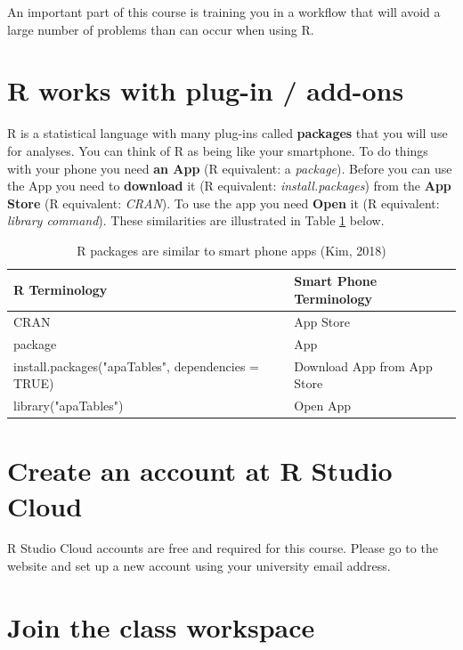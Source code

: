 \documentclass[
]{krantz}
\begin{document}
An important part of this course is training you in a workflow that will avoid a large number of problems than can occur when using R.

\hypertarget{r-works-with-plug-in-add-ons}{%
\section{R works with plug-in / add-ons}\label{r-works-with-plug-in-add-ons}}

R is a statistical language with many plug-ins called \textbf{packages} that you will use for analyses. You can think of R as being like your smartphone. To do things with your phone you need \textbf{an App} (R equivalent: a \emph{package}). Before you can use the App you need to \textbf{download} it (R equivalent: \emph{install.packages}) from the \textbf{App Store} (R equivalent: \emph{CRAN}). To use the app you need \textbf{Open} it (R equivalent: \emph{library command}). These similarities are illustrated in Table \ref{tab:appstore} below.

\begin{table}

\caption{\label{tab:appstore}R packages are similar to smart phone apps (Kim, 2018)}
\centering
\begin{tabular}[t]{ll}
\toprule
R Terminology & Smart Phone Terminology\\
\midrule
CRAN & App Store\\
package & App\\
install.packages("apaTables", dependencies = TRUE) & Download App from App Store\\
library("apaTables") & Open App\\
\bottomrule
\end{tabular}
\end{table}

\hypertarget{create-an-account-at-r-studio-cloud}{%
\section{Create an account at R Studio Cloud}\label{create-an-account-at-r-studio-cloud}}

R Studio Cloud accounts are free and required for this course. Please go to the website and set up a new account using your university email address.

\hypertarget{join-the-class-workspace}{%
\section{Join the class workspace}\label{join-the-class-workspace}}
\end{document}
